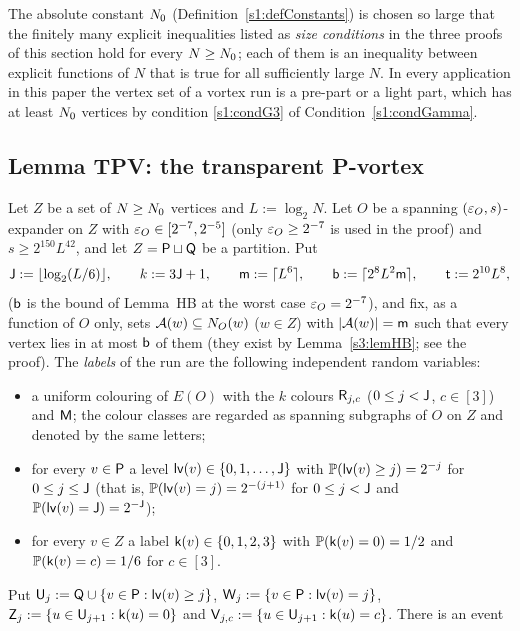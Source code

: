 \smallskip
The absolute constant $N_{0}$ (Definition~\ref{s1:defConstants}) is chosen so large that the finitely many
explicit inequalities listed as \emph{size conditions} in the three proofs of this section hold for every
$N\ge N_{0}$; each of them is an inequality between explicit functions of $N$ that is true for all sufficiently
large $N$. In every application in this paper the vertex set of a vortex run
is a pre-part or a light part, which has at least $N_{0}$ vertices by condition \ref{s1:condG3} of Condition~\ref{s1:condGamma}.

\subsection{Lemma TPV: the transparent P-vortex}\label{s4:ssecTPV}

\begin{lemma}\label{s4:lemTPV}
Let $Z$ be a set of $N\ge N_{0}$ vertices and $L:=\log_2N$. Let $O$ be a spanning $(\varepsilon_O,s)$-expander on $Z$ with
$\varepsilon_O\in[2^{-7},2^{-5}]$ (only $\varepsilon_O\ge2^{-7}$ is used in the proof) and $s\ge2^{150}L^{42}$, and let $Z=\mathsf{P}\sqcup\mathsf{Q}$ be a partition. Put
\[
\mathsf{J}:=\lfloor\log_2(L/6)\rfloor,\qquad k:=3\mathsf{J}+1,\qquad \mathsf{m}:=\lceil L^6\rceil,\qquad
\mathsf{b}:=\lceil2^8L^2\mathsf{m}\rceil,\qquad \mathsf{t}:=2^{10}L^8,
\]
($\mathsf{b}$ is the bound of Lemma~HB at the worst case $\varepsilon_O=2^{-7}$),
and fix, as a function of $O$ only, sets $\mathcal{A}(w)\subseteq N_O(w)$ ($w\in Z$) with $|\mathcal{A}(w)|=\mathsf{m}$ such that every vertex
lies in at most $\mathsf{b}$ of them (they exist by Lemma~\ref{s3:lemHB}; see the proof). The \emph{labels} of the run are
the following independent random variables:
\begin{itemize}
\item[(a)] a uniform colouring of $E(O)$ with the $k$ colours $\mathsf{R}_{j,c}$ ($0\le j<\mathsf{J}$, $c\in[3]$) and $\mathsf{M}$; the
  colour classes are regarded as spanning subgraphs of $O$ on $Z$ and denoted by the same letters;
\item[(b)] for every $v\in\mathsf{P}$ a level $\mathsf{lv}(v)\in\{0,1,\dots,\mathsf{J}\}$ with $\mathbb{P}(\mathsf{lv}(v)\ge j)=2^{-j}$ for
  $0\le j\le\mathsf{J}$ (that is, $\mathbb{P}(\mathsf{lv}(v)=j)=2^{-(j+1)}$ for $0\le j<\mathsf{J}$ and $\mathbb{P}(\mathsf{lv}(v)=\mathsf{J})=2^{-\mathsf{J}}$);
\item[(c)] for every $v\in Z$ a label $\mathsf{k}(v)\in\{0,1,2,3\}$ with $\mathbb{P}(\mathsf{k}(v)=0)=1/2$ and
  $\mathbb{P}(\mathsf{k}(v)=c)=1/6$ for $c\in[3]$.
\end{itemize}
Put $\mathsf{U}_j:=\mathsf{Q}\cup\{v\in\mathsf{P}:\mathsf{lv}(v)\ge j\}$, $\mathsf{W}_j:=\{v\in\mathsf{P}:\mathsf{lv}(v)=j\}$,
$\mathsf{Z}_j:=\{u\in\mathsf{U}_{j+1}:\mathsf{k}(u)=0\}$ and $\mathsf{V}_{j,c}:=\{u\in\mathsf{U}_{j+1}:\mathsf{k}(u)=c\}$. There is an event

\end{lemma}
